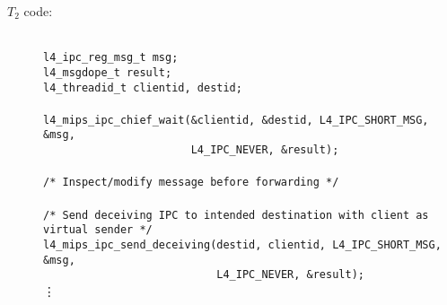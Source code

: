 \begin{description}
\item[$T_2$ code:] ~\\
  \hspace*{10pt} {\footnotesize\verb+l4_ipc_reg_msg_t msg;+} \\
  \hspace*{10pt} {\footnotesize\verb+l4_msgdope_t result;+} \\
  \hspace*{10pt} {\footnotesize\verb+l4_threadid_t clientid, destid;+} \\ \\
  \hspace*{10pt} {\footnotesize\verb+l4_mips_ipc_chief_wait(&clientid, &destid, L4_IPC_SHORT_MSG, &msg,+} \\
  \hspace*{10pt} {\footnotesize\verb+                       L4_IPC_NEVER, &result);+} \\ \\
  \hspace*{10pt} {\footnotesize\verb+/* Inspect/modify message before forwarding */+}\\ \\
  \hspace*{15pt} {\footnotesize\verb+/* Send deceiving IPC to intended destination with client as virtual sender */+} \\
  \hspace*{10pt} {\footnotesize\verb+l4_mips_ipc_send_deceiving(destid, clientid, L4_IPC_SHORT_MSG, &msg,+} \\
  \hspace*{10pt} {\footnotesize\verb+                           L4_IPC_NEVER, &result);+} \\ 
  \hspace*{40pt} \vdots   
  
\end{description}



% 
